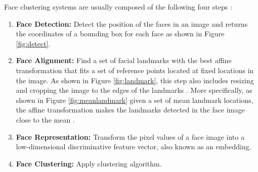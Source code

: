 \documentclass[12pt,english]{article}
\begin{document}
Face clustering systems are usually composed of the following four steps \cite{trigueros}: 

\begin{enumerate}
  \item \textbf{Face Detection:} Detect the position of the faces in an image and returns the coordinates of a bounding box for each face as shown in Figure \ref{fig:detect}.
  \item \textbf{Face Alignment:} Find a set of facial landmarks with the best affine transformation that fits a set of reference points located at fixed locations in the image. As shown in Figure \ref{fig:landmark}, this step also includes resizing and cropping the image to the edges of the landmarks \cite{amos}. More specifically, as shown in Figure \ref{fig:meanlandmark} given a set of mean landmark locations, the affine transformation makes the landmarks detected in the face image close to the mean \cite{amos}.
  
  \item \textbf{Face Representation:} Transform the pixel values of a face image into a low-dimensional discriminative feature vector, also known as an embedding. 
  \item \textbf{Face Clustering:} Apply clustering algorithm.
\end{enumerate} 
 
\end{document}
